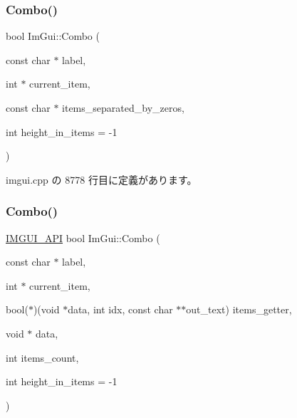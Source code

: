 \subsubsection{\texorpdfstring{Combo()}{Combo()}\hspace{0.1cm}{\footnotesize\ttfamily [2/3]}}
{\footnotesize\ttfamily bool Im\+Gui\+::\+Combo (\begin{DoxyParamCaption}\item[{const char $\ast$}]{label,  }\item[{int $\ast$}]{current\+\_\+item,  }\item[{const char $\ast$}]{items\+\_\+separated\+\_\+by\+\_\+zeros,  }\item[{int}]{height\+\_\+in\+\_\+items = {\ttfamily -\/1} }\end{DoxyParamCaption})}



 imgui.\+cpp の 8778 行目に定義があります。

\mbox{\label{namespace_im_gui_a65d00f64f98ccb810bdb75721612948c}} 
\subsubsection{\texorpdfstring{Combo()}{Combo()}\hspace{0.1cm}{\footnotesize\ttfamily [3/3]}}
{\footnotesize\ttfamily \mbox{\hyperlink{imgui_8h_a43829975e84e45d1149597467a14bbf5}{I\+M\+G\+U\+I\+\_\+\+A\+PI}} bool Im\+Gui\+::\+Combo (\begin{DoxyParamCaption}\item[{const char $\ast$}]{label,  }\item[{int $\ast$}]{current\+\_\+item,  }\item[{bool($\ast$)(void $\ast$data, int idx, const char $\ast$$\ast$out\+\_\+text)}]{items\+\_\+getter,  }\item[{void $\ast$}]{data,  }\item[{int}]{items\+\_\+count,  }\item[{int}]{height\+\_\+in\+\_\+items = {\ttfamily -\/1} }\end{DoxyParamCaption})}

\mbox{\label{namespace_im_gui_a98a4fecf50da4fb3489cee71a72cc577}} 
